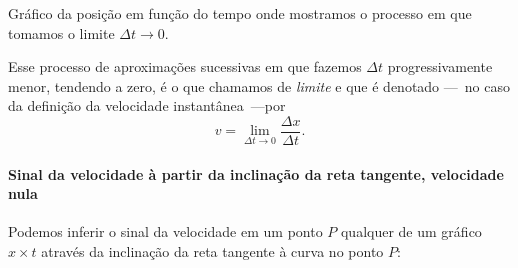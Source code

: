 \begin{marginfigure}[-1.5cm]
\caption{Gráfico da posição em função do tempo onde mostramos o processo em que tomamos o limite $\Delta t \to 0$.\label{Fig:Interp_graf_vel_med_lim}}
\end{marginfigure}

Esse processo de aproximações sucessivas em que fazemos $\Delta t$ progressivamente menor, tendendo a zero, é o que chamamos de \emph{limite} e que é denotado ---~no caso da definição da velocidade instantânea~---por
\begin{equation}
  v = \lim_{\Delta t \to 0} \frac{\Delta x}{\Delta t}.
\end{equation}

\paragraph{Sinal da velocidade à partir da inclinação da reta tangente, velocidade nula}

Podemos inferir o sinal da velocidade em um ponto $P$ qualquer de um gráfico $x\times t$ através da inclinação da reta tangente à curva no ponto $P$: 

